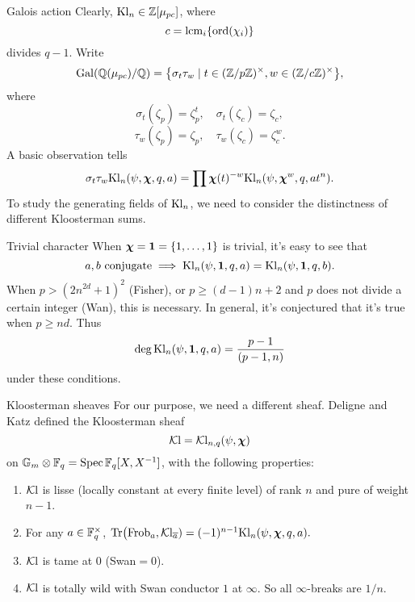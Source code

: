 \documentclass[aspectratio=169,handout]{beamer}
\newcommand\bchi{{\boldsymbol\chi}}
\begin{document}
\begin{frame}{Galois action}
Clearly, ${\mathrm{Kl}}_n\in{\mathbb{Z}}[\mu_{pc}]$, where
	\[c=\mathrm{lcm}_i {\left\{{\mathrm{ord}}(\chi_i)\right\}}\]
divides $q-1$. \pause
Write
	\[{\mathrm{Gal}}({\mathbb{Q}}(\mu_{pc})/{\mathbb{Q}})={\left\{\sigma_t\tau_w\mid t\in ({\mathbb{Z}}/p{\mathbb{Z}})^\times,w\in({\mathbb{Z}}/c{\mathbb{Z}})^\times\right\}},\]
where
	\[\sigma_t(\zeta_p)=\zeta_p^t,\quad \sigma_t(\zeta_c)=\zeta_c,\]
	\[\tau_w(\zeta_p)=\zeta_p,\quad \tau_w(\zeta_c)=\zeta_c^w.\] \pause
A basic observation tells
	\[\sigma_t\tau_w\Kl_n(\psi,\bchi,q,a)=\prod\bchi(t)^{-w}\Kl_n(\psi,\bchi^w,q,at^n).\]
To study the generating fields of ${\mathrm{Kl}}_n$, we need to consider the distinctness of different Kloosterman sums.

\end{frame}


\begin{frame}{Trivial character}
When $\bchi={\bf1}=\set{1,\dots,1}$ is trivial, it's easy to see that
	\[a,b\ \text{conjugate} \implies \Kl_n(\psi,{\bf1},q,a)=\Kl_n(\psi,{\bf1},q,b).\] \pause
When $p>(2n^{2d}+1)^2$ (Fisher), or $p\ge(d-1)n+2$ and	$p$ does not divide a certain integer (Wan), this is necessary. In general, it's conjectured that it's true when $p\ge nd$.
Thus 
	\[\deg {\mathrm{Kl}}_n(\psi,{\bf1},q,a)=\frac{p-1}{(p-1,n)}\]
under these conditions.

\end{frame}


\begin{frame}{Kloosterman sheaves}
For our purpose, we need a different sheaf.
Deligne and Katz defined the Kloosterman sheaf
	\[\CKl=\CKl_{n,q}(\psi,\bchi)\]
on $\mathbb{G}_m\otimes {\mathbb{F}}_q=\operatorname{Spec} {\mathbb{F}}_q[X,X^{-1}]$, with the following properties:
\begin{enumerate}
\item ${\mathcal{K}\mathrm{l}}$ is lisse (locally constant at every finite level) of rank $n$ and pure of weight $n-1$.
\item For any $a\in {\mathbb{F}}_q^\times$,
	$\Tr\bigl(\Frob_a,\CKl_{\ov a})=(-1)^{n-1}\Kl_n(\psi,\bchi,q,a).$
\item ${\mathcal{K}\mathrm{l}}$ is tame at $0$ (Swan$=0$).
\item ${\mathcal{K}\mathrm{l}}$ is totally wild with Swan conductor $1$ at $\infty$. So all $\infty$-breaks are $1/n$.
\end{enumerate}

\end{frame}
\end{document}
